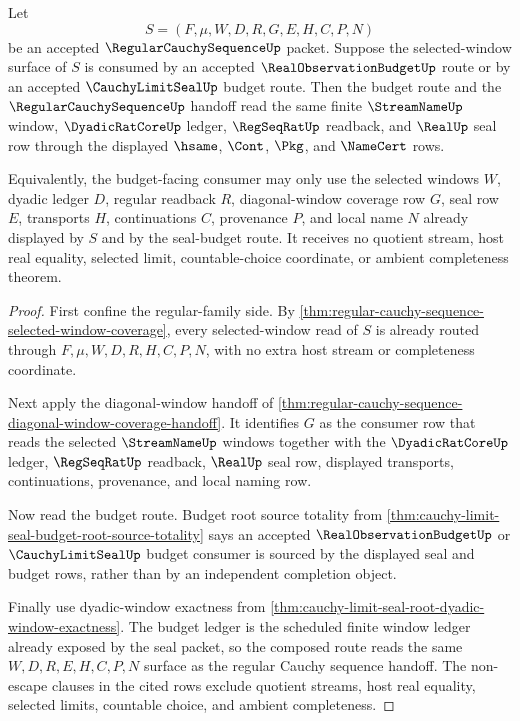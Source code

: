 \begin{theorem}
\label{thm:regular-cauchy-sequence-budget-window-synchronization}
Let
$$
S=(F,\mu,W,D,R,G,E,H,C,P,N)
$$
be an accepted $\RegularCauchySequenceUp$ packet. Suppose the selected-window surface of $S$ is consumed by an accepted $\RealObservationBudgetUp$ route or by an accepted $\CauchyLimitSealUp$ budget route. Then the budget route and the $\RegularCauchySequenceUp$ handoff read the same finite $\StreamNameUp$ window, $\DyadicRatCoreUp$ ledger, $\RegSeqRatUp$ readback, and $\RealUp$ seal row through the displayed $\hsame$, $\Cont$, $\Pkg$, and $\NameCert$ rows.

Equivalently, the budget-facing consumer may only use the selected windows $W$, dyadic ledger $D$, regular readback $R$, diagonal-window coverage row $G$, seal row $E$, transports $H$, continuations $C$, provenance $P$, and local name $N$ already displayed by $S$ and by the seal-budget route. It receives no quotient stream, host real equality, selected limit, countable-choice coordinate, or ambient completeness theorem.
\end{theorem}
\begin{proof}
First confine the regular-family side. By \autoref{thm:regular-cauchy-sequence-selected-window-coverage}, every selected-window read of $S$ is already routed through $F,\mu,W,D,R,H,C,P,N$, with no extra host stream or completeness coordinate.

Next apply the diagonal-window handoff of \autoref{thm:regular-cauchy-sequence-diagonal-window-coverage-handoff}. It identifies $G$ as the consumer row that reads the selected $\StreamNameUp$ windows together with the $\DyadicRatCoreUp$ ledger, $\RegSeqRatUp$ readback, $\RealUp$ seal row, displayed transports, continuations, provenance, and local naming row.

Now read the budget route. Budget root source totality from \autoref{thm:cauchy-limit-seal-budget-root-source-totality} says an accepted $\RealObservationBudgetUp$ or $\CauchyLimitSealUp$ budget consumer is sourced by the displayed seal and budget rows, rather than by an independent completion object.

Finally use dyadic-window exactness from \autoref{thm:cauchy-limit-seal-root-dyadic-window-exactness}. The budget ledger is the scheduled finite window ledger already exposed by the seal packet, so the composed route reads the same $W,D,R,E,H,C,P,N$ surface as the regular Cauchy sequence handoff. The non-escape clauses in the cited rows exclude quotient streams, host real equality, selected limits, countable choice, and ambient completeness.
\end{proof}

